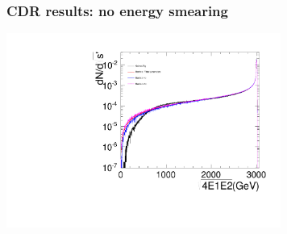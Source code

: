 \documentclass{beamer}
\begin{document}
\begin{frame}
\frametitle{CDR results: no energy smearing}
\centering
\includegraphics[width=9cm,page=3]{Spectra_BHWide_noEsmearing}
\end{frame}
\end{document}

